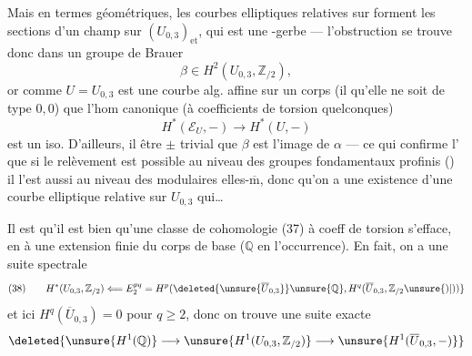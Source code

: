 
Mais en termes géométriques,  les courbes elliptiques relatives  sur  forment les sections d'un champ sur $(U_{0,3})_{\mathrm{et}}$, qui est une -gerbe --- l'obstruction se trouve donc dans un groupe de Brauer
\[
\beta\in H^2(U_{0,3},\mathbb Z_{/2}), \tag{37}
\]
or comme $U=U_{0,3}$ est une courbe alg.  affine sur un corps (il  qu'elle ne soit de type $0,0$)  que l'hom canonique (à coefficients de torsion quelconques)
\[
H^*(\mathcal E_U,-)\longrightarrow H^*(U,-)
\]
est un iso. D'ailleurs, il  être $\pm$ trivial que $\beta$ est l'image de $\alpha$ --- ce qui confirme l' que  si le relèvement est possible au niveau des groupes fondamentaux profinis () il l'est aussi au niveau des  modulaires elles-$\overline{\mathrm m}$, donc qu'on a une existence d'une courbe elliptique relative sur $U_{0,3}$ qui\ldots


Il est  qu'il est bien  qu'une classe de cohomologie (37) à coeff de torsion s'efface, en  à une extension finie du  corps de base ($\mathbb Q$ en l'occurrence). En fait, on a une suite spectrale
\[
(38)\qquad H^*(U_{0,3},\mathbb Z_{/2})
\Longleftarrow E_2^{pq}
=H^p(\deleted{\unsure{\overline U_{0,3}}}\unsure{\mathbb Q},H^q(\overline U_{0,3},\mathbb Z_{/2}\unsure{)|))}
\]
et ici $H^q(\overline U_{0,3})=0$ pour $q\geq 2$, donc on trouve une suite exacte
\[
\deleted{\unsure{H^1(\mathbb Q)}\longrightarrow
\unsure{H^1(U_{0,3},\mathbb Z_{/2})}\longrightarrow
\unsure{H^1(\overline U_{0,3},-)}}
\]

